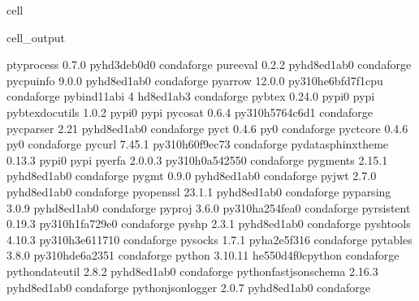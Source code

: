 \documentclass[letterpaper,table,10pt,english]{jupyterBook}
\begin{document}
\begin{sphinxuseclass}{cell}
\begin{sphinxVerbatimOutput}
\begin{sphinxuseclass}{cell_output}
\begin{sphinxVerbatim}[commandchars=\\\{\}]
ptyprocess                0.7.0              pyhd3deb0d\PYGZus{}0    conda\PYGZhy{}forge
pure\PYGZus{}eval                 0.2.2              pyhd8ed1ab\PYGZus{}0    conda\PYGZhy{}forge
py\PYGZhy{}cpuinfo                9.0.0              pyhd8ed1ab\PYGZus{}0    conda\PYGZhy{}forge
pyarrow                   12.0.0          py310he6bfd7f\PYGZus{}1\PYGZus{}cpu    conda\PYGZhy{}forge
pybind11\PYGZhy{}abi              4                    hd8ed1ab\PYGZus{}3    conda\PYGZhy{}forge
pybtex                    0.24.0                   pypi\PYGZus{}0    pypi
pybtex\PYGZhy{}docutils           1.0.2                    pypi\PYGZus{}0    pypi
pycosat                   0.6.4           py310h5764c6d\PYGZus{}1    conda\PYGZhy{}forge
pycparser                 2.21               pyhd8ed1ab\PYGZus{}0    conda\PYGZhy{}forge
pyct                      0.4.6                      py\PYGZus{}0    conda\PYGZhy{}forge
pyct\PYGZhy{}core                 0.4.6                      py\PYGZus{}0    conda\PYGZhy{}forge
pycurl                    7.45.1          py310h60f9ec7\PYGZus{}3    conda\PYGZhy{}forge
pydata\PYGZhy{}sphinx\PYGZhy{}theme       0.13.3                   pypi\PYGZus{}0    pypi
pyerfa                    2.0.0.3         py310h0a54255\PYGZus{}0    conda\PYGZhy{}forge
pygments                  2.15.1             pyhd8ed1ab\PYGZus{}0    conda\PYGZhy{}forge
pygmt                     0.9.0              pyhd8ed1ab\PYGZus{}0    conda\PYGZhy{}forge
pyjwt                     2.7.0              pyhd8ed1ab\PYGZus{}0    conda\PYGZhy{}forge
pyopenssl                 23.1.1             pyhd8ed1ab\PYGZus{}0    conda\PYGZhy{}forge
pyparsing                 3.0.9              pyhd8ed1ab\PYGZus{}0    conda\PYGZhy{}forge
pyproj                    3.6.0           py310ha254fea\PYGZus{}0    conda\PYGZhy{}forge
pyrsistent                0.19.3          py310h1fa729e\PYGZus{}0    conda\PYGZhy{}forge
pyshp                     2.3.1              pyhd8ed1ab\PYGZus{}0    conda\PYGZhy{}forge
pyshtools                 4.10.3          py310h3e61171\PYGZus{}0    conda\PYGZhy{}forge
pysocks                   1.7.1              pyha2e5f31\PYGZus{}6    conda\PYGZhy{}forge
pytables                  3.8.0           py310hde6a235\PYGZus{}1    conda\PYGZhy{}forge
python                    3.10.11         he550d4f\PYGZus{}0\PYGZus{}cpython    conda\PYGZhy{}forge
python\PYGZhy{}dateutil           2.8.2              pyhd8ed1ab\PYGZus{}0    conda\PYGZhy{}forge
python\PYGZhy{}fastjsonschema     2.16.3             pyhd8ed1ab\PYGZus{}0    conda\PYGZhy{}forge
python\PYGZhy{}json\PYGZhy{}logger        2.0.7              pyhd8ed1ab\PYGZus{}0    conda\PYGZhy{}forge

\end{sphinxVerbatim}
\end{sphinxuseclass}
\end{sphinxVerbatimOutput}
\end{sphinxuseclass}
\end{document}
